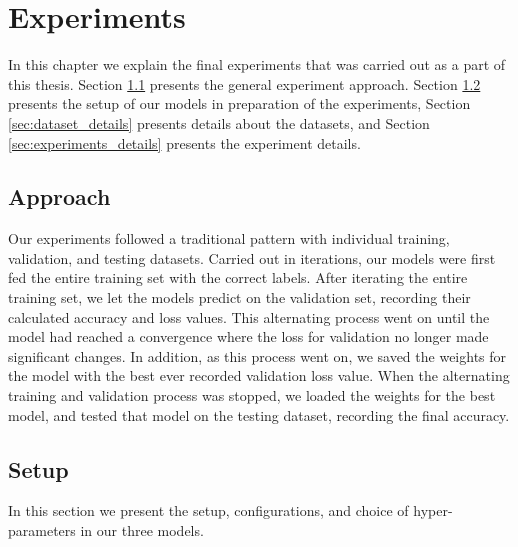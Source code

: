 
\chapter{Experiments}
\label{ch:experiments}
In this chapter we explain the final experiments that was carried out as a part of this thesis. Section \ref{sec:approach} presents the general experiment approach. Section \ref{sec:setup} presents the setup of our models in preparation of the experiments, Section \ref{sec:dataset_details} presents details about the datasets, and Section \ref{sec:experiments_details} presents the experiment details.


\section{Approach}
\label{sec:approach}
Our experiments followed a traditional pattern with individual training, validation, and testing datasets. Carried out in iterations, our models were first fed the entire training set with the correct labels. After iterating the entire training set, we let the models predict on the validation set, recording their calculated accuracy and loss values. This alternating process went on until the model had reached a convergence where the loss for validation no longer made significant changes. In addition, as this process went on, we saved the weights for the model with the best ever recorded validation loss value. When the alternating training and validation process was stopped, we loaded the weights for the best model, and tested that model on the testing dataset, recording the final accuracy.


\section{Setup}
\label{sec:setup}
In this section we present the setup, configurations, and choice of hyper-parameters in our three models. 


